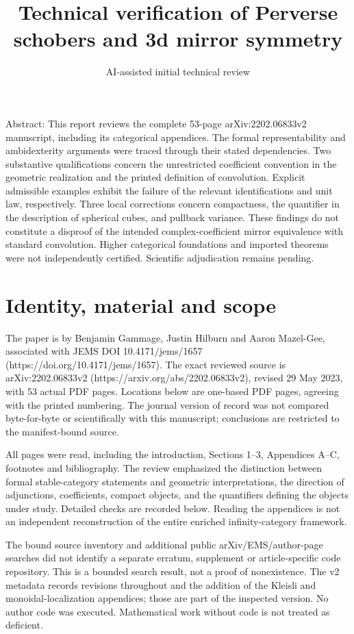 \documentclass[10pt]{article}
\title{Technical verification of
Perverse schobers and 3d mirror symmetry}
\author{AI-assisted initial technical review}
\date{}
\begin{document}
\maketitle
Abstract: This report reviews the complete 53-page arXiv:2202.06833v2 manuscript, including its categorical appendices. The formal representability and ambidexterity arguments were traced through their stated dependencies. Two substantive qualifications concern the unrestricted coefficient convention in the geometric realization and the printed definition of convolution. Explicit admissible examples exhibit the failure of the relevant identifications and unit law, respectively. Three local corrections concern compactness, the quantifier in the description of spherical cubes, and pullback variance. These findings do not constitute a disproof of the intended complex-coefficient mirror equivalence with standard convolution. Higher categorical foundations and imported theorems were not independently certified. Scientific adjudication remains pending.\par
\section*{Identity, material and scope}
The paper is by Benjamin Gammage, Justin Hilburn and Aaron Mazel-Gee, associated with JEMS DOI 10.4171/jems/1657 (https://doi.org/10.4171/jems/1657). The exact reviewed source is arXiv:2202.06833v2 (https://arxiv.org/abs/2202.06833v2), revised 29 May 2023, with 53 actual PDF pages. Locations below are one-based PDF pages, agreeing with the printed numbering. The journal version of record was not compared byte-for-byte or scientifically with this manuscript; conclusions are restricted to the manifest-bound source.\par
All pages were read, including the introduction, Sections 1–3, Appendices A–C, footnotes and bibliography. The review emphasized the distinction between formal stable-category statements and geometric interpretations, the direction of adjunctions, coefficients, compact objects, and the quantifiers defining the objects under study. Detailed checks are recorded below. Reading the appendices is not an independent reconstruction of the entire enriched infinity-category framework.\par
The bound source inventory and additional public arXiv/EMS/author-page searches did not identify a separate erratum, supplement or article-specific code repository. This is a bounded search result, not a proof of nonexistence. The v2 metadata records revisions throughout and the addition of the Kleisli and monoidal-localization appendices; those are part of the inspected version. No author code was executed. Mathematical work without code is not treated as deficient.\par
\end{document}
